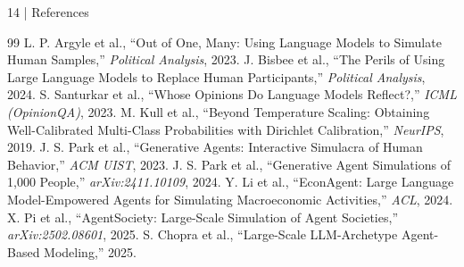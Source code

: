 \documentclass[10pt,aspectratio=169]{beamer}
\begin{document}
\begin{frame}{14 | References}
    \footnotesize
    \begin{thebibliography}{99}
         L. P. Argyle et al., ``Out of One, Many: Using Language Models to Simulate Human Samples,'' \textit{Political Analysis}, 2023.
         J. Bisbee et al., ``The Perils of Using Large Language Models to Replace Human Participants,'' \textit{Political Analysis}, 2024.
         S. Santurkar et al., ``Whose Opinions Do Language Models Reflect?,'' \textit{ICML (OpinionQA)}, 2023.
         M. Kull et al., ``Beyond Temperature Scaling: Obtaining Well-Calibrated Multi-Class Probabilities with Dirichlet Calibration,'' \textit{NeurIPS}, 2019.
         J. S. Park et al., ``Generative Agents: Interactive Simulacra of Human Behavior,'' \textit{ACM UIST}, 2023.
         J. S. Park et al., ``Generative Agent Simulations of 1,000 People,'' \textit{arXiv:2411.10109}, 2024.
         Y. Li et al., ``EconAgent: Large Language Model-Empowered Agents for Simulating Macroeconomic Activities,'' \textit{ACL}, 2024.
         X. Pi et al., ``AgentSociety: Large-Scale Simulation of Agent Societies,'' \textit{arXiv:2502.08601}, 2025.
         S. Chopra et al., ``Large-Scale LLM-Archetype Agent-Based Modeling,'' 2025.
    \end{thebibliography}
\end{frame}
\end{document}
